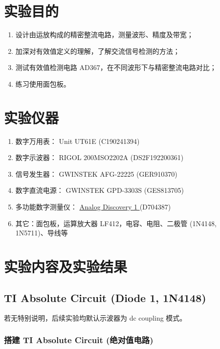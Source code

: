 \documentclass[UTF8]{article}
\begin{document}
\section{实验目的}

\begin{enumerate}
    \item 设计由运放构成的精密整流电路，测量波形、精度及带宽；
    \item 加深对有效值定义的理解，了解交流信号检测的方法；
    \item 测试有效值检测电路 AD367，在不同波形下与精密整流电路对比；
    \item 练习使用面包板。
\end{enumerate}
\section{实验仪器}

\begin{enumerate}
    \item 数字万用表： Unit UT61E (C190241394)
    \item 数字示波器： RIGOL 200MSO2202A (DS2F192200361)
    \item 信号发生器： GWINSTEK AFG-22225 (GER910370)
    \item 数字直流电源： GWINSTEK GPD-3303S (GES813705)
    \item 多功能数字测量仪： 
    \href{https://digilent.com/reference/test-and-measurement/analog-discovery/start
    }{ %
    Analog Discovery 1
    } 
    (D704387)
    \item 其它：面包板，运算放大器 LF412，电容、电阻、二极管 (1N4148, 1N5711)、导线等
\end{enumerate}


\section{实验内容及实验结果}

\subsection{TI Absolute Circuit (Diode 1, 1N4148)}
\vspace*{-3mm}
\begin{redbox}
    若无特别说明，后续实验均默认示波器为 dc coupling 模式。
\end{redbox}

\subsubsection{搭建 TI Absolute Circuit (绝对值电路)}
\end{document}
